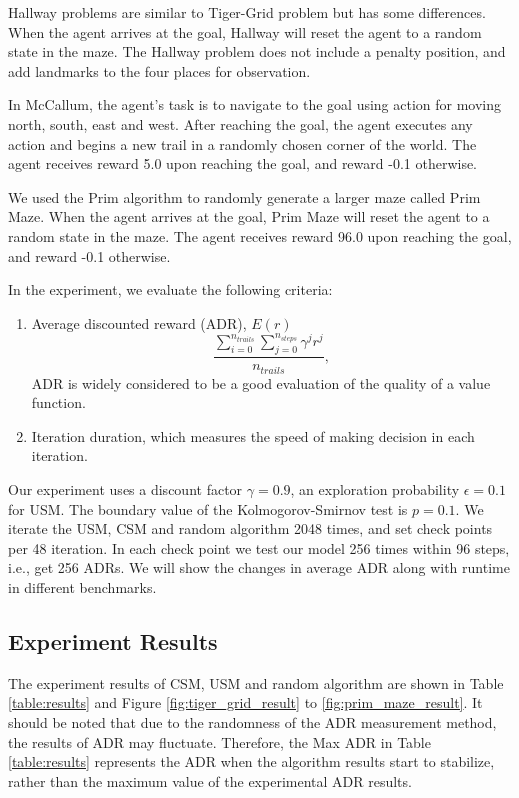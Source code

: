 \documentclass{article}
\begin{document}
Hallway problems are similar to Tiger-Grid problem but has some differences. When the agent
arrives at the goal, Hallway will reset the agent to a random state in the maze.
The Hallway problem does not include a penalty position, and add landmarks to the four places
for observation.

In McCallum, the agent’s task is to navigate to the goal using action for moving north,
south, east and west. After reaching the goal, the agent executes any action and begins a new
trail in a randomly chosen corner of the world. The agent receives reward 5.0 upon reaching
the goal, and reward -0.1 otherwise.

We used the Prim algorithm to randomly generate a larger maze called Prim Maze. 
When the agent arrives at the goal, Prim Maze will reset the agent to a random state in the maze.
The agent receives reward 96.0 upon reaching the goal, and reward -0.1 otherwise.


In the experiment, we evaluate the following criteria:

\begin{enumerate}
  \item Average discounted reward (ADR), $E(r)$
  \begin{equation}
    \frac{\sum_{i=0}^{n_{trails}} \sum_{j=0}^{n_{steps}} \gamma^j r^j}{n_{trails}},
  \end{equation}
  ADR is widely considered to be a good evaluation of the quality of a value function.
  
  \item Iteration duration, which measures the speed of making decision in each iteration.
\end{enumerate}

Our experiment uses a discount factor $\gamma=0.9$, an exploration probability $\epsilon=0.1$ for USM.
The boundary value of the Kolmogorov-Smirnov test is $p=0.1$. We iterate the USM, CSM and random algorithm
2048 times, and set check points per 48 iteration. In each check point we test our model 256 times
within 96 steps, i.e., get 256 ADRs. We will show the changes in average ADR along with runtime in
different benchmarks.

\subsection{Experiment Results}

The experiment results of CSM, USM and random algorithm are shown in  Table \ref{table:results} and Figure  \ref{fig:tiger_grid_result} to \ref{fig:prim_maze_result}. It should be noted that due to the randomness of the ADR measurement method, the results of ADR may fluctuate. Therefore, the Max ADR in Table \ref{table:results}  represents the ADR when the algorithm results start to stabilize, rather than the maximum value of the experimental ADR results.
\end{document}
